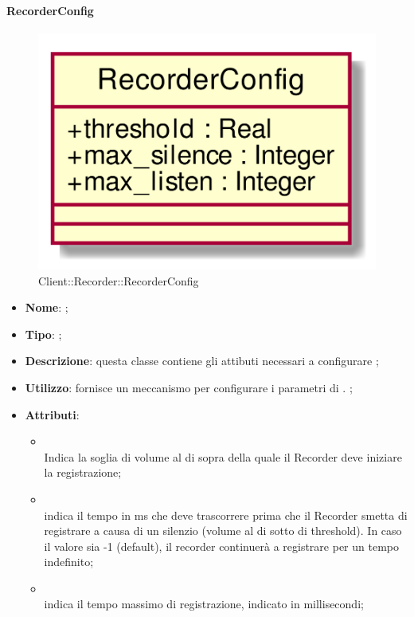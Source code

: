 \hypertarget{RecorderConfig_label}{\paragraph{RecorderConfig}}
\begin{figure}[h]
	\centering
	\includegraphics[width=\textwidth,height=\textheight,keepaspectratio]{images/ClassRecorderConfig.png}
	\caption{Client::Recorder::RecorderConfig}
\end{figure}
\begin{itemize}
	\item \textbf{Nome}: ;
	\item \textbf{Tipo}: ;
	\item \textbf{Descrizione}: questa classe contiene gli attibuti necessari a configurare ;
	\item \textbf{Utilizzo}: fornisce un meccanismo per configurare i parametri di . ;
	\item \textbf{Attributi}:
	\begin{itemize}
		\item[]  \\
		Indica la soglia di volume al di sopra della quale il Recorder deve iniziare la registrazione;
		\item[]  \\
		indica il tempo in ms che deve trascorrere prima che il Recorder smetta di registrare a causa di un silenzio (volume al di sotto di threshold). In caso il valore sia -1 (default), il recorder continuerà a registrare per un tempo indefinito;
		\item[]  \\
		indica il tempo massimo di registrazione, indicato in millisecondi;
	\end{itemize}
\end{itemize}
\FloatBarrier

